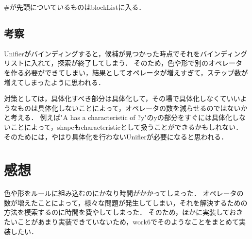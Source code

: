 \documentclass{jarticle}
\begin{document}
#が先頭についているものはblockListに入る．

\subsection{考察}
Unifierがバインディングすると，候補が見つかった時点でそれをバインディングリストに入れて，探索が終了してしまう．
そのため，色や形で別のオペレータを作る必要ができてしまい，結果としてオペレータが増えすぎて，ステップ数が増えてしまったように思われる．

対策としては，具体化すべき部分は具体化して，その場で具体化しなくていいようなものは具体化しないことによって，オペレータの数を減らせるのではないかと考える．
例えば"A has a characteristic of ?y"のyの部分をすぐには具体化しないことによって，shapeもcharacteristicとして扱うことができるかもしれない．
そのためには，やはり具体化を行わないUnifierが必要になると思われる．

\section{感想}
色や形をルールに組み込むのにかなり時間がかかってしまった．
オペレータの数が増えたことによって，様々な問題が発生してしまい，それを解決するための方法を模索するのに時間を費やしてしまった．
そのため，ほかに実装しておきたいことがあまり実装できていないため，work6でそのようなことをまとめて実装したい．
\end{document}
